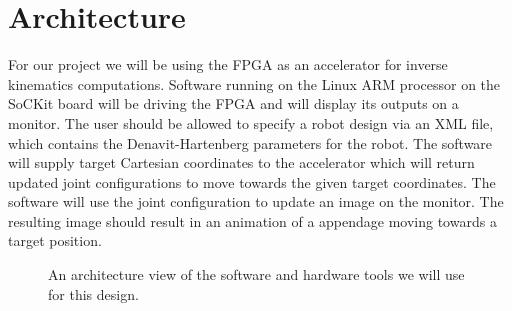 \section{Architecture}
For our project we will be using the FPGA as an accelerator for
inverse kinematics computations. Software running on the Linux ARM processor 
on the SoCKit board will be driving the FPGA and will display its outputs on 
a monitor. The user should be allowed to specify a robot design via an XML file, which contains the Denavit-Hartenberg parameters for the robot. The software will supply target Cartesian coordinates 
to the accelerator which will return updated joint configurations to 
move towards the given target coordinates. The software will use the 
joint configuration to update an image on the monitor. The resulting 
image should result in an animation of a appendage moving towards a target 
position.

\begin{figure}[ht]
\center
{}
\caption{An architecture view of the software and hardware tools we will use for this design.}
\label{fig:toolchain}
\end{figure}